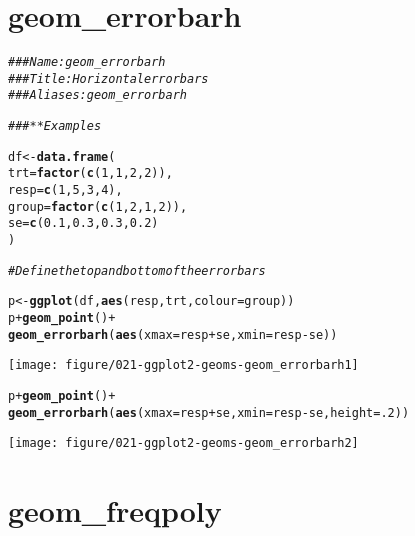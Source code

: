 \documentclass[a4paper,titlepage]{tufte-handout}\usepackage[]{graphicx}\usepackage[]{color}
\makeatletter
\def\maxwidth{ %
  \ifdim\Gin@nat@width>\linewidth
    \linewidth
  \else
    \Gin@nat@width
  \fi
}
\newcommand{\hlnum}[1]{\textcolor[rgb]{0.686,0.059,0.569}{#1}}%
\newcommand{\hlcom}[1]{\textcolor[rgb]{0.678,0.584,0.686}{\textit{#1}}}%
\newcommand{\hlopt}[1]{\textcolor[rgb]{0,0,0}{#1}}%
\newcommand{\hlstd}[1]{\textcolor[rgb]{0.345,0.345,0.345}{#1}}%
\newcommand{\hlkwb}[1]{\textcolor[rgb]{0.69,0.353,0.396}{#1}}%
\newcommand{\hlkwc}[1]{\textcolor[rgb]{0.333,0.667,0.333}{#1}}%
\newcommand{\hlkwd}[1]{\textcolor[rgb]{0.737,0.353,0.396}{\textbf{#1}}}%
\newenvironment{kframe}{%
 \def\at@end@of@kframe{}%
 \ifinner\ifhmode%
  \def\at@end@of@kframe{\end{minipage}}%
  \begin{minipage}{\columnwidth}%
 \fi\fi%
 \def\FrameCommand##1{\hskip\@totalleftmargin \hskip-\fboxsep
 \colorbox{shadecolor}{##1}\hskip-\fboxsep
     \hskip-\linewidth \hskip-\@totalleftmargin \hskip\columnwidth}%
 \MakeFramed {\advance\hsize-\width
   \@totalleftmargin\z@ \linewidth\hsize
   \@setminipage}}%
 {\par\unskip\endMakeFramed%
 \at@end@of@kframe}
\newenvironment{knitrout}{}{} %
\makeatother
\begin{document}
\section{geom\_errorbarh}

\begin{knitrout}
\color{fgcolor}\begin{kframe}
\begin{alltt}
\hlcom{### Name: geom_errorbarh}
\hlcom{### Title: Horizontal error bars}
\hlcom{### Aliases: geom_errorbarh}

\hlcom{### ** Examples}

\hlstd{df} \hlkwb{<-} \hlkwd{data.frame}\hlstd{(}
  \hlkwc{trt} \hlstd{=} \hlkwd{factor}\hlstd{(}\hlkwd{c}\hlstd{(}\hlnum{1}\hlstd{,} \hlnum{1}\hlstd{,} \hlnum{2}\hlstd{,} \hlnum{2}\hlstd{)),}
  \hlkwc{resp} \hlstd{=} \hlkwd{c}\hlstd{(}\hlnum{1}\hlstd{,} \hlnum{5}\hlstd{,} \hlnum{3}\hlstd{,} \hlnum{4}\hlstd{),}
  \hlkwc{group} \hlstd{=} \hlkwd{factor}\hlstd{(}\hlkwd{c}\hlstd{(}\hlnum{1}\hlstd{,} \hlnum{2}\hlstd{,} \hlnum{1}\hlstd{,} \hlnum{2}\hlstd{)),}
  \hlkwc{se} \hlstd{=} \hlkwd{c}\hlstd{(}\hlnum{0.1}\hlstd{,} \hlnum{0.3}\hlstd{,} \hlnum{0.3}\hlstd{,} \hlnum{0.2}\hlstd{)}
\hlstd{)}

\hlcom{# Define the top and bottom of the errorbars}

\hlstd{p} \hlkwb{<-} \hlkwd{ggplot}\hlstd{(df,} \hlkwd{aes}\hlstd{(resp, trt,} \hlkwc{colour} \hlstd{= group))}
\hlstd{p} \hlopt{+} \hlkwd{geom_point}\hlstd{()} \hlopt{+}
  \hlkwd{geom_errorbarh}\hlstd{(}\hlkwd{aes}\hlstd{(}\hlkwc{xmax} \hlstd{= resp} \hlopt{+} \hlstd{se,} \hlkwc{xmin} \hlstd{= resp} \hlopt{-} \hlstd{se))}
\end{alltt}
\end{kframe}
\texttt{[image: figure/021-ggplot2-geoms-geom\_errorbarh1]} 
\begin{kframe}\begin{alltt}
\hlstd{p} \hlopt{+} \hlkwd{geom_point}\hlstd{()} \hlopt{+}
  \hlkwd{geom_errorbarh}\hlstd{(}\hlkwd{aes}\hlstd{(}\hlkwc{xmax} \hlstd{= resp} \hlopt{+} \hlstd{se,} \hlkwc{xmin} \hlstd{= resp} \hlopt{-} \hlstd{se,} \hlkwc{height} \hlstd{=} \hlnum{.2}\hlstd{))}
\end{alltt}
\end{kframe}
\texttt{[image: figure/021-ggplot2-geoms-geom\_errorbarh2]} 

\end{knitrout}


\section{geom\_freqpoly}
\end{document}
